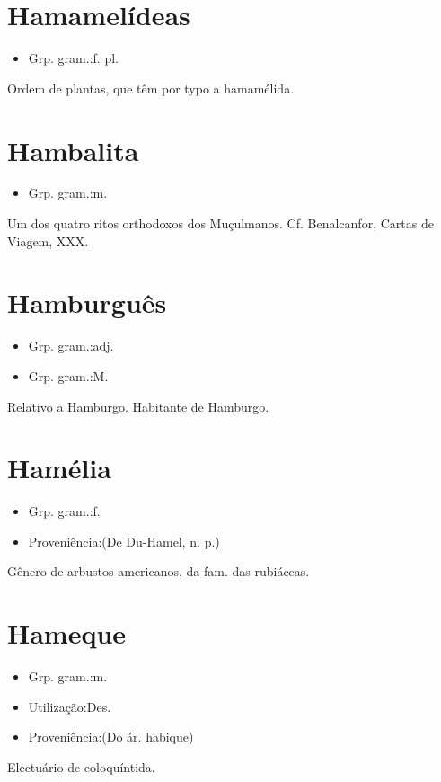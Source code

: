 \documentclass{article}
\begin{document}
\section{Hamamelídeas}
\begin{itemize}
\item {Grp. gram.:f. pl.}
\end{itemize}
Ordem de plantas, que têm por typo a hamamélida.
\section{Hambalita}
\begin{itemize}
\item {Grp. gram.:m.}
\end{itemize}
Um dos quatro ritos orthodoxos dos Muçulmanos. Cf. Benalcanfor, \textunderscore Cartas de Viagem\textunderscore , XXX.
\section{Hamburguês}
\begin{itemize}
\item {Grp. gram.:adj.}
\end{itemize}
\begin{itemize}
\item {Grp. gram.:M.}
\end{itemize}
Relativo a Hamburgo.
Habitante de Hamburgo.
\section{Hamélia}
\begin{itemize}
\item {Grp. gram.:f.}
\end{itemize}
\begin{itemize}
\item {Proveniência:(De Du-\textunderscore Hamel\textunderscore , n. p.)}
\end{itemize}
Gênero de arbustos americanos, da fam. das rubiáceas.
\section{Hameque}
\begin{itemize}
\item {Grp. gram.:m.}
\end{itemize}
\begin{itemize}
\item {Utilização:Des.}
\end{itemize}
\begin{itemize}
\item {Proveniência:(Do ár. \textunderscore habique\textunderscore )}
\end{itemize}
Electuário de coloquíntida.
\end{document}
